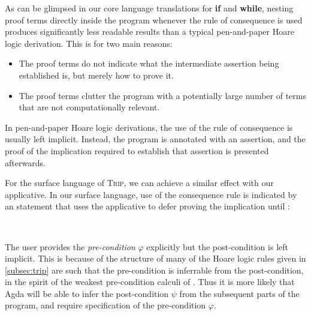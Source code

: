 \documentclass[sigplan,review]{acmart}\settopmatter{printfolios=true,printccs=false,printacmref=false}
\begin{document}
As can be glimpsed in our core language translations for \textbf{if} 
and \textbf{while}, nesting proof terms directly inside the program
whenever the rule of consequence is used produces significantly less 
readable results than a typical pen-and-paper Hoare logic 
derivation. This is for two main reasons:
\begin{itemize}
\item The proof terms do not indicate what the intermediate assertion being established is,
      but merely how to prove it.
\item The proof terms clutter the program with a potentially large number of 
      terms that are not computationally relevant.
\end{itemize}
In pen-and-paper Hoare logic derivations, the use of the rule of consequence 
is usually left implicit. Instead, the program is annotated with an assertion, 
and the proof of the implication required to establish that assertion is 
presented afterwards.

For the surface language of \textsc{Trip}, we can achieve a similar effect 
with our  applicative. In our surface language, use of 
the consequence rule is indicated by an 
statement that uses the  applicative to defer proving 
the implication until :
\begin{code}
\>[2]\AgdaSpace{}%
\AgdaSymbol{:}\AgdaSpace{}%
\AgdaSymbol{(}\AgdaSpace{}%
\AgdaSymbol{:}\AgdaSpace{}%
\AgdaSymbol{)}\AgdaSpace{}%
\AgdaSpace{}%
\AgdaSpace{}%
\AgdaOperator{\AgdaDatatype{[}}\AgdaSpace{}%
\AgdaSpace{}%
\AgdaOperator{\AgdaDatatype{,}}\AgdaSpace{}%
\AgdaSpace{}%
\AgdaOperator{\AgdaDatatype{]}}\<%
\\
%
\>[2]\AgdaSpace{}%
\AgdaSpace{}%
\AgdaSymbol{=}\AgdaSpace{}%
\AgdaSpace{}%
\AgdaSpace{}%
\AgdaSpace{}%
\<%
\end{code}
The user provides the \emph{pre-condition} $\varphi$ explicitly but the post-condition 
is left implicit. This is because of the structure of many of the Hoare logic rules given 
in \autoref{subsec:trip} are such that the pre-condition is inferrable from 
the post-condition, in the spirit of the weakest pre-condition calculi of \citet{dijkstra}. Thus it is more likely 
that Agda will be able to infer the post-condition $\psi$ from the subsequent parts of the program, and 
require specification of the pre-condition $\varphi$.
\end{document}
